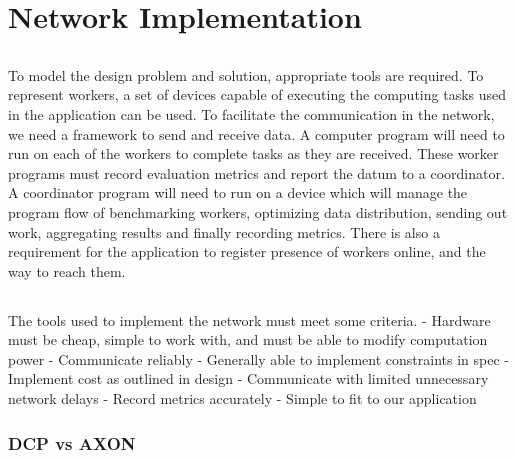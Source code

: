 \documentclass[../mthe-493-final-project.tex]{subfiles}
\begin{document}
    \chapter{Network Implementation}
    \label{ch:network-implementation}
    
    \section{}
    To model the design problem and solution, appropriate tools are required. To represent workers, a set of devices capable of executing the computing tasks used in the application can be used. To facilitate the communication in the network, we need a framework to send and receive data. A computer program will need to run on each of the workers to complete tasks as they are received. These worker programs must record evaluation metrics and report the datum to a coordinator. A coordinator program will need to run on a device which will manage the program flow of benchmarking workers, optimizing data distribution, sending out work, aggregating results and finally recording metrics. There is also a requirement for the application to register presence of workers online, and the way to reach them.
    
    
    \section{}
    
    The tools used to implement the network must meet some criteria. 
    - Hardware must be cheap, simple to work with, and must be able to modify computation power
    - Communicate reliably 
    - Generally able to implement constraints in spec
        - Implement cost as outlined in design
    - Communicate with limited unnecessary network delays
    - Record metrics accurately
    - Simple to fit to our application
    

    \subsection{DCP vs AXON}
    
\end{document}
